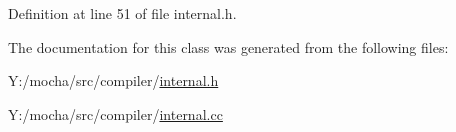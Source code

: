 Definition at line 51 of file internal.h.



The documentation for this class was generated from the following files:\begin{DoxyCompactItemize}
\item 
Y:/mocha/src/compiler/\hyperlink{internal_8h}{internal.h}\item 
Y:/mocha/src/compiler/\hyperlink{internal_8cc}{internal.cc}\end{DoxyCompactItemize}
